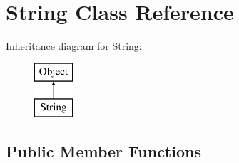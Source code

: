 \hypertarget{classString}{
\section{String Class Reference}
\label{classString}
}
Inheritance diagram for String:\begin{figure}[H]
\begin{center}
\leavevmode
\includegraphics[height=2cm]{classString}
\end{center}
\end{figure}
\subsection*{Public Member Functions}
